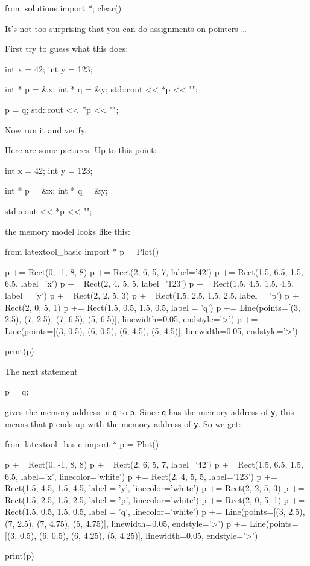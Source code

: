 \begin{python0}
from solutions import *; clear()
\end{python0}

It's not too surprising that you can do assignments on pointers \ldots{}

First try to guess what this does:

\begin{consolethree}[escapeinside=||]
int x = 42;
int y = 123;

int * p = &x;
int * q = &y;
std::cout << *p << "\n";

p = q;
std::cout << *p << "\n";
\end{consolethree}
Now run it and verify.

Here are some pictures. Up to this point:

\begin{consolethree}[escapeinside=||]
int x = 42;
int y = 123;

int * p = &x;
int * q = &y;

std::cout << *p << "\n";
\end{consolethree}
the memory model looks like this:
\begin{python}
from latextool_basic import *
p = Plot()

p += Rect(0, -1, 8, 8)
p += Rect(2, 6, 5, 7, label='42')
p += Rect(1.5, 6.5, 1.5, 6.5, label='x')
p += Rect(2, 4, 5, 5, label='123')
p += Rect(1.5, 4.5, 1.5, 4.5, label = 'y')
p += Rect(2, 2, 5, 3)
p += Rect(1.5, 2.5, 1.5, 2.5, label = 'p')
p += Rect(2, 0, 5, 1)
p += Rect(1.5, 0.5, 1.5, 0.5, label = 'q')
p += Line(points=[(3, 2.5), (7, 2.5), (7, 6.5), (5, 6.5)], linewidth=0.05, endstyle='>')
p += Line(points=[(3, 0.5), (6, 0.5), (6, 4.5), (5, 4.5)], linewidth=0.05, endstyle='>')

print(p)
\end{python}
The next statement

\begin{consolethree}[escapeinside=||]
p = q;
\end{consolethree}

gives the memory address in \texttt{q} to \texttt{p}. Since \texttt{q} has the memory address of \texttt{y}, this means that \texttt{p} ends up with the memory address of \texttt{y}. So we get:

\begin{python}
from latextool_basic import *
p = Plot()

p += Rect(0, -1, 8, 8)
p += Rect(2, 6, 5, 7, label='42')
p += Rect(1.5, 6.5, 1.5, 6.5, label='x', linecolor='white')
p += Rect(2, 4, 5, 5, label='123')
p += Rect(1.5, 4.5, 1.5, 4.5, label = 'y', linecolor='white')
p += Rect(2, 2, 5, 3)
p += Rect(1.5, 2.5, 1.5, 2.5, label = 'p', linecolor='white')
p += Rect(2, 0, 5, 1)
p += Rect(1.5, 0.5, 1.5, 0.5, label = 'q', linecolor='white')
p += Line(points=[(3, 2.5), (7, 2.5), (7, 4.75), (5, 4.75)], linewidth=0.05, endstyle='>')
p += Line(points=[(3, 0.5), (6, 0.5), (6, 4.25), (5, 4.25)], linewidth=0.05, endstyle='>')

print(p)
\end{python}

